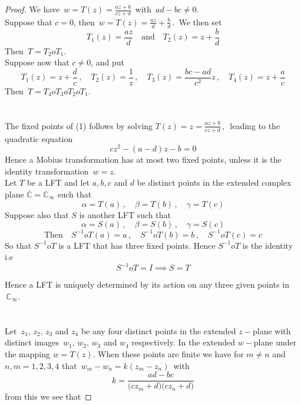 \documentclass[11pt,a4paper]{article}
\theoremstyle{definition}
\begin{document}
\begin{proof}
We have $\, w = T(z) = \frac{az + b}{cz + d}\,$ with $\, ad - bc \neq 0$.\\
Suppose that $c  = 0$, then  $\, w = T(z) = \frac{az}{d} + \frac{b}{d}\,.\,$ We then set
$$T_1(z) = \frac{az}{d}\quad \text{and}\quad  T_2(z) = z + \frac{b}{d}$$
Then $\, T = T_2 o T_1$.\\

Suppose now that $c \neq 0$, and put 
$$T_1(z) = z + \frac{d}{c}\,, \quad  T_2(z) = \frac{1}{z}\,, \quad  T_3(z) = \frac{bc -ad}{c^2}z\,,\quad  T_4(z) = z + \frac{a}{c}$$
Then $\, T = T_4oT_3oT_2oT_1$.\\\\\\





The fixed points of (1) follows by solving $ T(z) = z = \frac{az + b}{cz + d}\,, \,$ leading to the quadratic equation $$cz^2 - (a-d)z -b = 0$$
Hence a Mobius transformation has at most two fixed points, unless it is the identity transformation $\, w = z$.\\

Let $T$ be a LFT and let $a,b,c$ and $d$ be distinct points in the extended complex plane $\overline{\mathbb{C}} = \mathbb{C}_{\infty}$ such that $$\alpha = T(a)\, , \quad  \beta = T(b)\,, \quad  \gamma = T(c)$$
Suppose also that $S$ is another LFT such that  $$\alpha = S(a)\, , \quad  \beta = S(b)\,, \quad  \gamma = S(c)$$
$$\text{Then}\quad  S^{-1}oT(a) = a\,, \quad   S^{-1}oT(b) = b\,, \quad   S^{-1}oT(c) = c$$
So that $S^{-1}oT$ is a LFT that has three fixed points. Hence $S^{-1}oT$ is the identity i.e 
$$\boxed{S^{-1}oT  = I \implies S = T}$$

Hence a LFT is uniquely determined by its action on  any three given points in $\,\mathbb{C}_{\infty}$.\\\\\\







Let $\, z_1, \, z_2, \, z_3$ and $z_4$ be any four distinct points in the extended $z-$plane with distinct images $\, w_1, \, w_2, \, w_3$ and $w_4$ respectively. In the extended $w-$plane under the mapping $w = T(z)$. When these points are finite we have for $m\neq n$ and $n,m = 1,2,3,4$ that $\, w_m - w_n = k(z_m - z_n)\,$ with 
$$\boxed{k = \frac{ad - bc}{\big(cz_m + d\big)\big(cz_n + d\big)}}$$  from this we see that


\end{proof}
\end{document}
